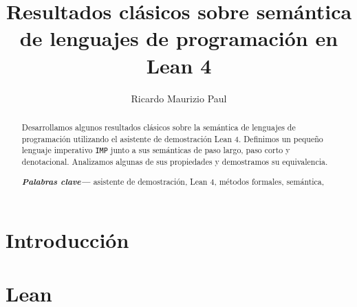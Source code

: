 \documentclass[a4paper, 10pt, openany]{report}
\title{Resultados clásicos sobre semántica de lenguajes de programación en Lean 4}
\author{Ricardo Maurizio Paul}
\providecommand{\keywords}[1]
{
  \small	
  \textbf{\textit{Palabras clave---}} #1
}
\begin{document}

\maketitle


\tableofcontents

\begin{abstract}
	Desarrollamos algunos resultados clásicos sobre la semántica de lenguajes de 
	programación utilizando el asistente de demostración Lean 4. 
	Definimos un pequeño lenguaje imperativo \texttt{IMP} junto a
	sus semánticas de paso largo, paso corto y denotacional.
	Analizamos algunas de sus propiedades y demostramos su equivalencia.

	\keywords{
		asistente de demostración,
		Lean 4, 
		métodos formales, 
		semántica, 
	}
\end{abstract}


\chapter{Introducción}\label{CHAP:INTRO}


\chapter{Lean}\label{CHAP:LEAN}

\end{document}
